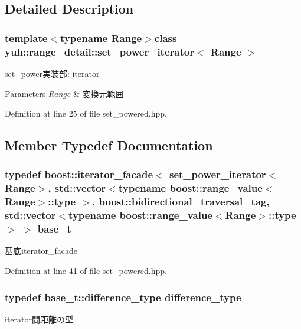 \subsection{\-Detailed \-Description}
\subsubsection*{template$<$typename Range$>$class yuh\-::range\-\_\-detail\-::set\-\_\-power\-\_\-iterator$<$ Range $>$}

set\-\_\-power実装部\-: iterator 
\begin{DoxyParams}{\-Parameters}
{\em \-Range} & 変換元範囲 \\
\hline
\end{DoxyParams}


\-Definition at line 25 of file set\-\_\-powered.\-hpp.



\subsection{\-Member \-Typedef \-Documentation}
\hypertarget{classyuh_1_1range__detail_1_1set__power__iterator_a66fa2f0147f406817dd3c1c24a015477}{
\subsubsection[{base\-\_\-t}]{\setlength{\rightskip}{0pt plus 5cm}typedef boost\-::iterator\-\_\-facade$<$ {\bf set\-\_\-power\-\_\-iterator}$<$\-Range$>$, std\-::vector$<$typename boost\-::range\-\_\-value$<$\-Range$>$\-::type $>$, boost\-::bidirectional\-\_\-traversal\-\_\-tag, std\-::vector$<$typename boost\-::range\-\_\-value$<$\-Range$>$\-::type $>$ $>$ {\bf base\-\_\-t}}}\label{db/d16/classyuh_1_1range__detail_1_1set__power__iterator_a66fa2f0147f406817dd3c1c24a015477}
基底iterator\-\_\-facade 

\-Definition at line 41 of file set\-\_\-powered.\-hpp.

\hypertarget{classyuh_1_1range__detail_1_1set__power__iterator_a9ac6039762e1b262cecb98589ffc1d75}{
\subsubsection[{difference\-\_\-type}]{\setlength{\rightskip}{0pt plus 5cm}typedef base\-\_\-t\-::difference\-\_\-type {\bf difference\-\_\-type}}}\label{db/d16/classyuh_1_1range__detail_1_1set__power__iterator_a9ac6039762e1b262cecb98589ffc1d75}
iterator間距離の型 

